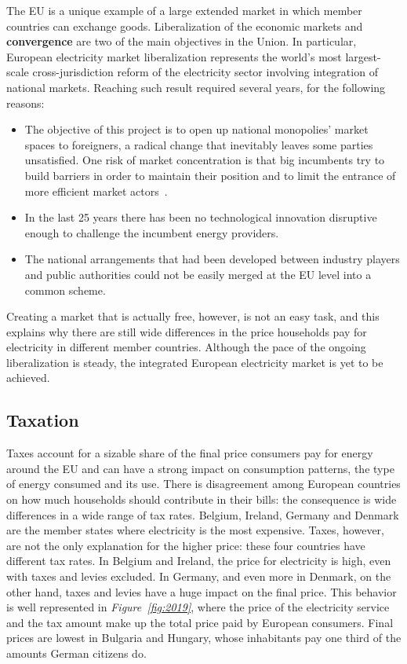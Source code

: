 \documentclass[a4paper,12pt]{book}
\begin{document}
The EU is a unique example of a large extended market in which member countries can exchange goods. Liberalization of the economic markets and \textbf{convergence} are two of the main objectives in the Union. In particular, European electricity market liberalization represents the world's most largest-scale cross-jurisdiction reform of the electricity sector involving integration of national markets. Reaching such result required several years, for the following reasons:

\begin{itemize}

\item The objective of this project is to open up national monopolies’ market spaces to foreigners, a radical change that inevitably leaves some parties unsatisfied.  One risk of market concentration is that big incumbents try to build barriers in order to maintain their position and to limit the entrance of more efficient market actors~\cite{ringel2003liberalising}.

\item In the last 25 years there has been no technological innovation disruptive enough to challenge the incumbent energy
providers.

\item The national arrangements that had been developed between industry players and public authorities could not be easily merged at the EU level into a common scheme.
\end{itemize}

Creating a market that is actually free, however, is not an easy task, and this explains why there are still wide differences in the price households pay for electricity in different member countries. Although the pace of the ongoing liberalization is steady, the integrated European electricity market is yet to be achieved. \\

\subsection{Taxation}

Taxes account for a sizable share of the final price consumers pay for energy around the EU and can have a strong impact on consumption patterns, the type of energy consumed and its use. There is disagreement among European countries on how much households should contribute in their bills: the consequence is wide differences in a wide range of tax rates. Belgium, Ireland, Germany and Denmark are the member states where electricity is the most expensive. Taxes, however, are not the only explanation for the higher price: these four countries have different tax rates. In Belgium and Ireland, the price for electricity is high, even with taxes and levies excluded. In Germany, and even more in Denmark, on the other hand, taxes and levies have a huge impact on the final price. This behavior is well represented in \textit{Figure~\ref{fig:2019}}, where the price of the electricity service and the tax amount make up the total price paid by European consumers. Final prices are lowest in Bulgaria and Hungary, whose inhabitants pay one third of the amounts German citizens do.
\end{document}
